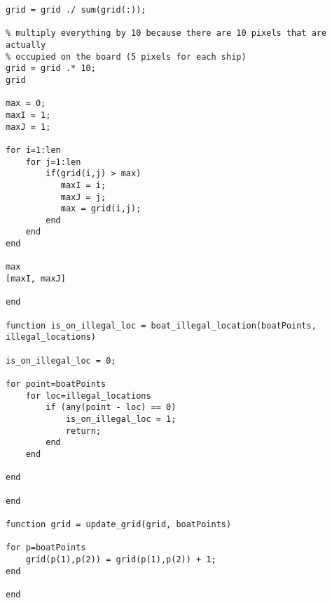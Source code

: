 \documentclass[11pt,a4paper,oneside]{report}
\begin{document}
\begin{lstlisting}
grid = grid ./ sum(grid(:));

% multiply everything by 10 because there are 10 pixels that are actually
% occupied on the board (5 pixels for each ship)
grid = grid .* 10;
grid

max = 0;
maxI = 1; 
maxJ = 1;

for i=1:len
    for j=1:len
        if(grid(i,j) > max)
           maxI = i;
           maxJ = j;
           max = grid(i,j); 
        end
    end
end

max
[maxI, maxJ]

end

function is_on_illegal_loc = boat_illegal_location(boatPoints, illegal_locations)

is_on_illegal_loc = 0;

for point=boatPoints
    for loc=illegal_locations
        if (any(point - loc) == 0)
            is_on_illegal_loc = 1;
            return;
        end
    end
    
end

end

function grid = update_grid(grid, boatPoints)

for p=boatPoints
    grid(p(1),p(2)) = grid(p(1),p(2)) + 1;
end

end
\end{lstlisting}
\end{document}
